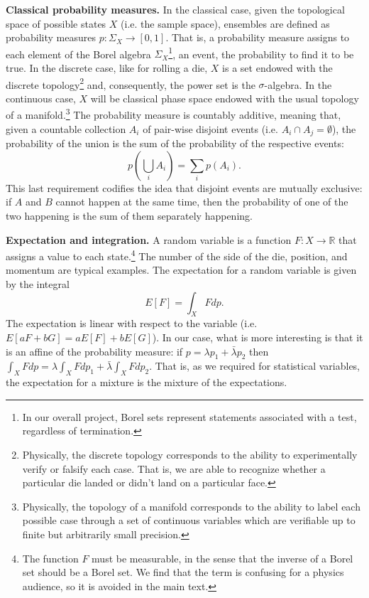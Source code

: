 \documentclass[10pt,twocolumn, nofootinbib]{revtex4-2}
\begin{document}
\textbf{Classical probability measures.} In the classical case, given the topological space of possible states $X$ (i.e. the sample space), ensembles are defined as probability measures $p : \Sigma_X \to [0,1]$. That is, a probability measure assigns to each element of the Borel algebra $\Sigma_X$\footnote{In our overall project, Borel sets represent statements associated with a test, regardless of termination.}, an event, the probability to find it to be true. In the discrete case, like for rolling a die, $X$ is a set endowed with the discrete topology\footnote{Physically, the discrete topology corresponds to the ability to experimentally verify or falsify each case. That is, we are able to recognize whether a particular die landed or didn't land on a particular face.} and, consequently, the power set is the $\sigma$-algebra. In the continuous case, $X$ will be classical phase space endowed with the usual topology of a manifold.\footnote{Physically, the topology of a manifold corresponds to the ability to label each possible case through a set of continuous variables which are verifiable up to finite but arbitrarily small precision.}  The probability measure is countably additive, meaning that, given a countable collection $A_i$ of pair-wise disjoint events (i.e. $A_i \cap A_j = \emptyset$), the probability of the union is the sum of the probability of the respective events:
\begin{equation}
	p\left(\bigcup_i A_i \right) = \sum_i p(A_i).
\end{equation}
This last requirement codifies the idea that disjoint events are mutually exclusive: if $A$ and $B$ cannot happen at the same time, then the probability of one of the two happening is the sum of them separately happening.

\textbf{Expectation and integration.} A random variable is a function $F : X \to \mathbb{R}$ that assigns a value to each state.\footnote{The function $F$ must be measurable, in the sense that the inverse of a Borel set should be a Borel set. We find that the term is confusing for a physics audience, so it is avoided in the main text.} The number of the side of the die, position, and momentum are typical examples. The expectation for a random variable is given by the integral
\begin{equation}
	E[F] = \int_X F dp.
\end{equation}
The expectation is linear with respect to the variable (i.e. $E[aF+bG]= aE[F]+bE[G]$). In our case, what is more interesting is that it is an affine of the probability measure: if $p = \lambda p_1 + \bar{\lambda} p_2$ then $\int_X F dp = \lambda \int_X F dp_1 + \bar{\lambda} \int_X F dp_2$. That is, as we required for statistical variables, the expectation for a mixture is the mixture of the expectations.
\end{document}
